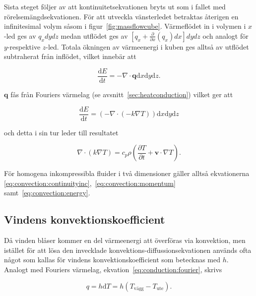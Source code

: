 Sista steget följer av att kontinuitetsekvationen bryts ut som i fallet med rörelsemängdsekvationen. För att utveckla vänsterledet betraktas återigen en infinitesimal volym såsom i figur~\ref{fig:massflowcube}. Värmeflödet in i volymen i $x$-led ges av $q_x dy dz$ medan utflödet ges av $\left[ q_x + \frac{\partial}{\partial x} \left( q_x\right)dx\right]dydz$ och analogt för $y$-respektive $z$-led. Totala ökningen av värmeenergi i kuben ges alltså av utflödet subtraherat från inflödet, vilket innebär att

\begin{equation}
\frac{\mathrm{d}E}{\mathrm{d}t} = - \nabla \cdot \mathbf{q} \mathrm{d}x\mathrm{d}y\mathrm{d}z.
\end{equation}

$\mathbf{q}$ fås från Fouriers värmelag (se avsnitt~\ref{sec:heatconduction}) vilket ger att

\begin{equation}
\label{reynoldsenergytwo}
\frac{\mathrm{d}E}{\mathrm{d}t} = \left( - \nabla \cdot \left( -k \nabla T \right) \right)\mathrm{d}x\mathrm{d}y\mathrm{d}z
\end{equation}

och detta i sin tur leder till resultatet

\begin{equation}
\label{eq:convection:energy}\boxed{ \; \; \;
\nabla \cdot \left( k \nabla T \right) = c_p \rho \left( \frac{\partial T}{\partial t} + \mathbf{v}\cdot \nabla T\right).
\; \; \;}
\end{equation}

För homogena inkompressibla fluider i två dimensioner gäller alltså ekvationerna
\eqref{eq:convection:continuityinc},~\eqref{eq:convection:momentum} samt~\eqref{eq:convection:energy}.

\subsection{Vindens konvektionskoefficient}
\label{subsec:windconv}

Då vinden blåser kommer en del värmeenergi att överföras via konvektion, men istället för att lösa den invecklade konvektions-diffussionsekvationen används ofta något som kallas för vindens konvektionskoefficient som betecknas med $h$. Analogt med Fouriers värmelag, ekvation~\ref{eq:conduction:fourier}, skrivs

\begin{equation}\boxed{ \; \; \;
q = h\mathrm{d}T = h\left( T_\text{vägg} - T_\text{ute}\right).
\; \; \;}\end{equation}

